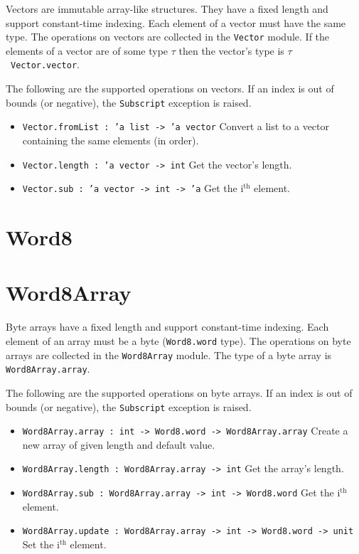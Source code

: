 \documentclass[12pt,a4paper]{book}
\begin{document}
Vectors are immutable array-like structures. They have a fixed length and support constant-time indexing. Each element of a vector must have the same type. The operations on vectors are collected in the \texttt{Vector} module. If the elements of a vector are of some type $\tau$ then the vector's type is $\tau$\ \texttt{Vector.vector}.

The following are the supported operations on vectors. If an index is out of bounds (or negative), the \texttt{Subscript} exception is raised.
\begin{itemize}
\item \texttt{Vector.fromList : 'a list -> 'a vector} Convert a list to a vector containing the same elements (in order).
\item \texttt{Vector.length : 'a vector -> int} Get the vector's length.
\item \texttt{Vector.sub : 'a vector -> int -> 'a} Get the i$^\textrm{th}$ element.
\end{itemize}

\section{Word8}

\section{Word8Array}
Byte arrays have a fixed length and support constant-time indexing. Each element of an array must be a byte (\texttt{Word8.word} type). The operations on byte arrays are collected in the \texttt{Word8Array} module. The type of a byte array is \texttt{Word8Array.array}.

The following are the supported operations on byte arrays. If an index is out of bounds (or negative), the \texttt{Subscript} exception is raised.
\begin{itemize}
\item \texttt{Word8Array.array : int -> Word8.word -> Word8Array.array} Create a new array of given length and default value.
\item \texttt{Word8Array.length : Word8Array.array -> int} Get the array's length.
\item \texttt{Word8Array.sub : Word8Array.array -> int -> Word8.word} Get the i$^\textrm{th}$ element.
\item \texttt{Word8Array.update : Word8Array.array -> int -> Word8.word -> unit} Set the i$^\textrm{th}$ element.
\end{itemize}
\end{document}
